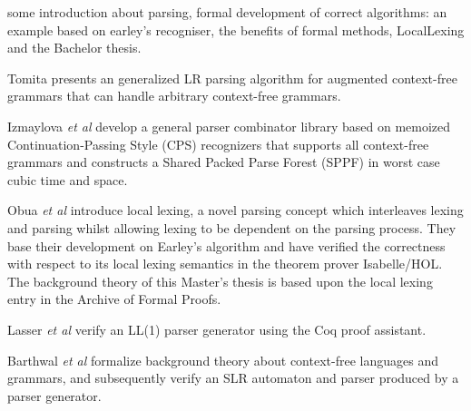 %
\begin{isabellebody}%
%
%
\isadelimtheory
%
\endisadelimtheory
%
\isatagtheory
%
\endisatagtheory
{\isafoldtheory}%
%
\isadelimtheory
%
\endisadelimtheory
%
\isadelimdocument
%
\endisadelimdocument
%
\isatagdocument
%
\isamarkuptrue%
%
\endisatagdocument
{\isafolddocument}%
%
\isadelimdocument
%
\endisadelimdocument
%
\begin{isamarkuptext}%
some introduction about parsing, formal development of correct algorithms: an example based on
earley's recogniser, the benefits of formal methods, LocalLexing and the Bachelor thesis.%
\end{isamarkuptext}\isamarkuptrue%
%
\isadelimdocument
%
\endisadelimdocument
%
\isatagdocument
%
\isamarkuptrue%
%
\endisatagdocument
{\isafolddocument}%
%
\isadelimdocument
%
\endisadelimdocument
%
\begin{isamarkuptext}%
Tomita \cite{Tomita:1987} presents an generalized LR parsing algorithm for augmented
context-free grammars that can handle arbitrary context-free grammars.

Izmaylova \textit{et al} \cite{Izmaylova:2016} develop a general parser 
combinator library based on memoized Continuation-Passing Style (CPS) recognizers that supports all
context-free grammars and constructs a Shared Packed Parse Forest (SPPF) in worst case cubic time and space.%
\end{isamarkuptext}\isamarkuptrue%
%
\begin{isamarkuptext}%
Obua \textit{et al} \cite{Obua:2017} introduce local lexing, a novel parsing concept which interleaves
lexing and parsing whilst allowing lexing to be dependent on the parsing process. They base their
development on Earley's algorithm and have verified the correctness with respect to its local lexing
semantics in the theorem prover Isabelle/HOL. The background theory of this Master's thesis is based
upon the local lexing entry \cite{LocalLexing-AFP} in the Archive of Formal Proofs.

Lasser \textit{et al} \cite{Lasser:2019} verify an LL(1) parser generator using the Coq proof assistant.

Barthwal \textit{et al} \cite{Barthwal:2009} formalize background theory
about context-free languages and grammars, and subsequently verify an SLR automaton and parser produced
by a parser generator.


\end{isamarkuptext}
\end{isabellebody}
